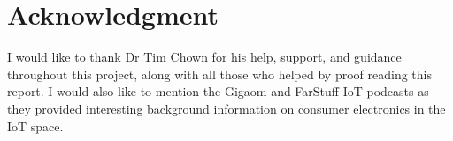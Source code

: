 \section*{Acknowledgment}
I would like to thank Dr Tim Chown for his help, support, and guidance
throughout this project, along with all those who helped by proof reading this
report. I would also like to mention the Gigaom and FarStuff IoT podcasts as
they provided interesting background information on consumer electronics in the
IoT space. 

